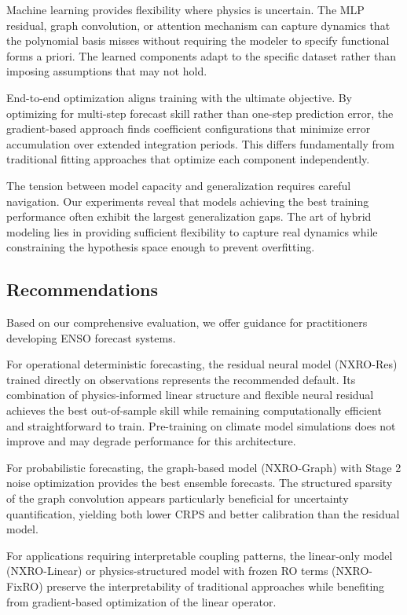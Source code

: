 Machine learning provides flexibility where physics is uncertain. The MLP residual, graph convolution, or attention mechanism can capture dynamics that the polynomial basis misses without requiring the modeler to specify functional forms a priori. The learned components adapt to the specific dataset rather than imposing assumptions that may not hold.

End-to-end optimization aligns training with the ultimate objective. By optimizing for multi-step forecast skill rather than one-step prediction error, the gradient-based approach finds coefficient configurations that minimize error accumulation over extended integration periods. This differs fundamentally from traditional fitting approaches that optimize each component independently.

The tension between model capacity and generalization requires careful navigation. Our experiments reveal that models achieving the best training performance often exhibit the largest generalization gaps. The art of hybrid modeling lies in providing sufficient flexibility to capture real dynamics while constraining the hypothesis space enough to prevent overfitting.

\subsection{Recommendations}

Based on our comprehensive evaluation, we offer guidance for practitioners developing ENSO forecast systems.

For operational deterministic forecasting, the residual neural model (NXRO-Res) trained directly on observations represents the recommended default. Its combination of physics-informed linear structure and flexible neural residual achieves the best out-of-sample skill while remaining computationally efficient and straightforward to train. Pre-training on climate model simulations does not improve and may degrade performance for this architecture.

For probabilistic forecasting, the graph-based model (NXRO-Graph) with Stage 2 noise optimization provides the best ensemble forecasts. The structured sparsity of the graph convolution appears particularly beneficial for uncertainty quantification, yielding both lower CRPS and better calibration than the residual model.

For applications requiring interpretable coupling patterns, the linear-only model (NXRO-Linear) or physics-structured model with frozen RO terms (NXRO-FixRO) preserve the interpretability of traditional approaches while benefiting from gradient-based optimization of the linear operator.

